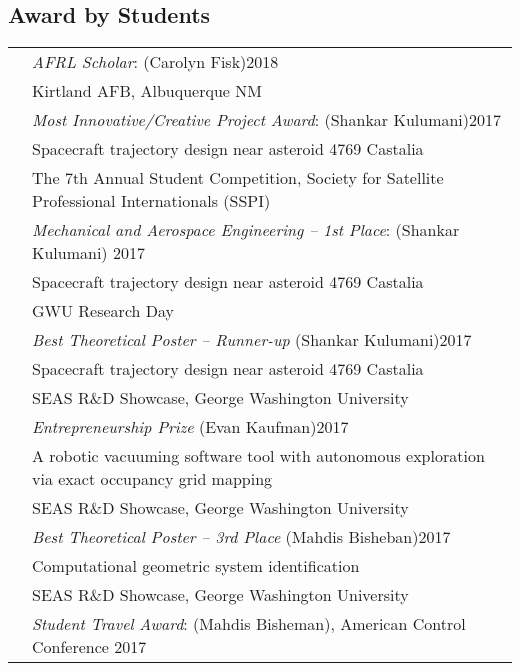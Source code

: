 \documentclass[10pt]{article}
\begin{document}
\vspace*{0.2cm}

\subsection*{Award by Students}
\setlength{\tabcolsep}{0cm}
\begin{tabularx}{\textwidth}{>{\setlength{\hsize}{0.5cm}}X X}%
& \textit{AFRL Scholar}: (Carolyn Fisk)\hfill 2018\\
& Kirtland AFB, Albuquerque NM\\[0.2cm]

& \textit{Most Innovative/Creative Project Award}: (Shankar Kulumani)\hfill 2017\\
& {Spacecraft trajectory design near asteroid 4769 Castalia}\\
& The 7th Annual Student Competition, Society for Satellite Professional Internationals (SSPI)\\[0.2cm]

& \textit{Mechanical and Aerospace Engineering -- 1st Place}: (Shankar Kulumani) \hfill 2017\\
& {Spacecraft trajectory design near asteroid 4769 Castalia}\\
& GWU Research Day\\[0.2cm]


& \textit{Best Theoretical Poster -- Runner-up} (Shankar Kulumani)\hfill 2017\\
& Spacecraft trajectory design near asteroid 4769 Castalia\\
& SEAS R\&D Showcase, George Washington University\\[0.2cm]


& \textit{Entrepreneurship Prize} (Evan Kaufman)\hfill 2017\\
& A robotic vacuuming software tool with autonomous exploration via exact occupancy grid mapping\\
& SEAS R\&D Showcase, George Washington University\\[0.2cm]


& \textit{Best Theoretical Poster -- 3rd Place} (Mahdis Bisheban)\hfill 2017\\
& Computational geometric system identification\\
& SEAS R\&D Showcase, George Washington University\\[0.2cm]


& \textit{Student Travel Award}: (Mahdis Bisheman), {American Control Conference} \hfill 2017
\\[0.2cm]



\end{tabularx}
\end{document}
